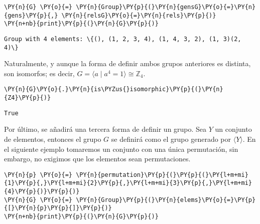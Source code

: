 \begin{itemize}
\begin{itemize}
\begin{enumerate}
\begin{tcolorbox}[breakable, size=fbox, boxrule=1pt, pad at break*=1mm,colback=cellbackground, colframe=cellborder]
\begin{Verbatim}[commandchars=\\\{\}]
\PY{n}{G} \PY{o}{=} \PY{n}{Group}\PY{p}{(}\PY{n}{gensG}\PY{o}{=}\PY{n}{gens}\PY{p}{,} \PY{n}{relsG}\PY{o}{=}\PY{n}{rels}\PY{p}{)}
\PY{n+nb}{print}\PY{p}{(}\PY{n}{G}\PY{p}{)}
\end{Verbatim}
\end{tcolorbox}

    \begin{Verbatim}[commandchars=\\\{\}]
Group with 4 elements: \{(), (1, 2, 3, 4), (1, 4, 3, 2), (1, 3)(2, 4)\}
    \end{Verbatim}

Naturalmente, y aunque la forma de definir ambos grupos anteriores es distinta, son isomorfos; es
decir, $G=\langle a \mid a^4=1 \rangle \cong \mathbb{Z}_4$.

    \begin{tcolorbox}[breakable, size=fbox, boxrule=1pt, pad at break*=1mm,colback=cellbackground, colframe=cellborder]
\begin{Verbatim}[commandchars=\\\{\}]
\PY{n}{G}\PY{o}{.}\PY{n}{is\PYZus{}isomorphic}\PY{p}{(}\PY{n}{Z4}\PY{p}{)}
\end{Verbatim}
\end{tcolorbox}

\begin{tcolorbox}[breakable, size=fbox, boxrule=.5pt, pad at break*=1mm, opacityfill=0]
\begin{Verbatim}[commandchars=\\\{\}]
True
\end{Verbatim}
\end{tcolorbox}



Por último, se añadirá una tercera forma de definir un grupo. Sea $Y$ un conjunto de elementos, entonces el grupo $G$ se definirá como el grupo generado por $\langle Y \rangle$. En el siguiente ejemplo tomaremos un conjunto con una única permutación, sin embargo, no exigimos que los elementos sean permutaciones.
    \begin{tcolorbox}[breakable, size=fbox, boxrule=1pt, pad at break*=1mm,colback=cellbackground, colframe=cellborder]
\begin{Verbatim}[commandchars=\\\{\}]
\PY{n}{p} \PY{o}{=} \PY{n}{permutation}\PY{p}{(}\PY{p}{(}\PY{l+m+mi}{1}\PY{p}{,}\PY{l+m+mi}{2}\PY{p}{,}\PY{l+m+mi}{3}\PY{p}{,}\PY{l+m+mi}{4}\PY{p}{)}\PY{p}{)}
\PY{n}{G} \PY{o}{=} \PY{n}{Group}\PY{p}{(}\PY{n}{elems}\PY{o}{=}\PY{p}{[}\PY{n}{p}\PY{p}{]}\PY{p}{)}
\PY{n+nb}{print}\PY{p}{(}\PY{n}{G}\PY{p}{)}
\end{Verbatim}
\end{tcolorbox}


\end{enumerate}
\end{itemize}
\end{itemize}
